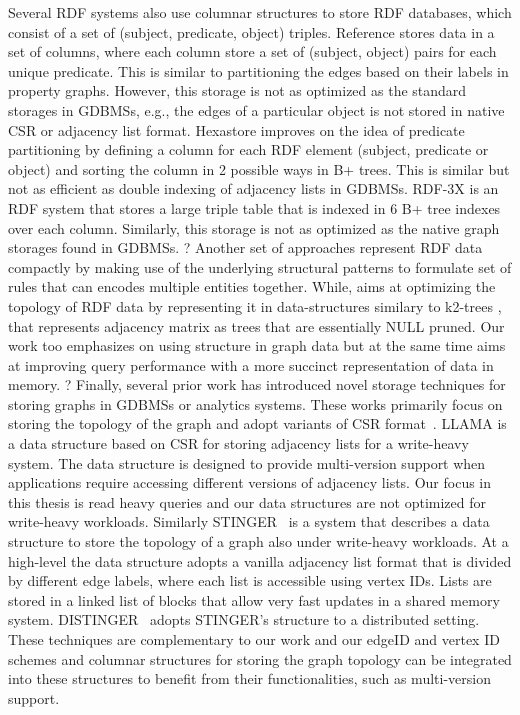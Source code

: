 Several RDF systems also use columnar structures to store RDF databases, which consist of a set of (subject, predicate, object) triples. Reference \cite{rdf-vertical} stores data in a set of columns, where each column store a set of (subject, object) pairs for each unique predicate. This is similar to partitioning the edges based on their labels in property graphs. However, this storage is not as optimized as the standard storages in GDBMSs, e.g., the edges of a particular object is not stored in native CSR or adjacency list format. Hexastore \cite{hexastore} improves on the idea of predicate partitioning by defining a column for each RDF element (subject, predicate or object) and sorting the column in 2 possible ways in B+ trees. This is similar but not as efficient as double indexing of adjacency lists in GDBMSs. RDF-3X \cite{rdf-3x} is an RDF system that stores a large triple table that is indexed in 6 B+ tree indexes over each column. Similarly, this storage is not as optimized as the native graph storages found in GDBMSs.
?
Another set of approaches \cite{comp-rdf, rbcomp, hdt} represent RDF data compactly by making use of the underlying structural patterns to formulate set of rules that can encodes multiple entities together. While, \cite{k2triples, ik2trees} aims at optimizing the topology of RDF data by representing it in data-structures similary to k2-trees \cite{k2trees}, that represents adjacency matrix as trees that are essentially NULL pruned. Our work too emphasizes on using structure in graph data but at the same time aims at improving query performance with a more succinct representation of data in memory.
?
Finally, several prior work has introduced novel storage techniques for storing graphs in GDBMSs or analytics systems. These works primarily focus on storing the topology of the graph and adopt variants of CSR format~\cite{yale}. LLAMA is a data structure based on CSR for storing adjacency lists for a write-heavy system. The data structure is designed to provide multi-version support when applications require accessing different versions of adjacency lists. Our focus in this thesis is read heavy queries and our data structures are not optimized for write-heavy workloads. Similarly STINGER~\cite{stinger} is a system that describes a data structure to store the topology of a graph also under write-heavy workloads. At a high-level the data structure adopts a vanilla adjacency list format that is divided by different edge labels, where each list is accessible using vertex IDs. Lists are stored in a linked list of blocks that allow very fast updates in a shared memory system. DISTINGER~\cite{distinger} adopts STINGER's structure to a distributed setting. These techniques are complementary to our work and our edgeID and vertex ID schemes and columnar structures for storing the graph topology can be integrated into these structures to benefit from their functionalities, such as multi-version support. 
